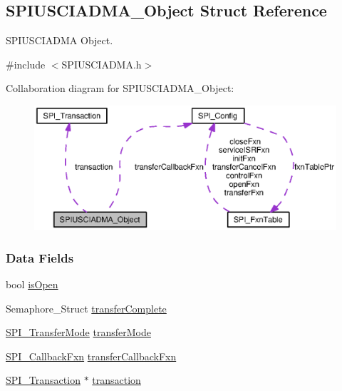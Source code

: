 \subsection{S\-P\-I\-U\-S\-C\-I\-A\-D\-M\-A\-\_\-\-Object Struct Reference}
\label{struct_s_p_i_u_s_c_i_a_d_m_a___object}


S\-P\-I\-U\-S\-C\-I\-A\-D\-M\-A Object.  




{\ttfamily \#include $<$S\-P\-I\-U\-S\-C\-I\-A\-D\-M\-A.\-h$>$}



Collaboration diagram for S\-P\-I\-U\-S\-C\-I\-A\-D\-M\-A\-\_\-\-Object\-:
\nopagebreak
\begin{figure}[H]
\begin{center}
\leavevmode
\includegraphics[width=350pt]{struct_s_p_i_u_s_c_i_a_d_m_a___object__coll__graph}
\end{center}
\end{figure}
\subsubsection*{Data Fields}
\begin{DoxyCompactItemize}
\item 
bool \hyperlink{struct_s_p_i_u_s_c_i_a_d_m_a___object_a3ffa3675d09e0d0346f89a0c88cbb9e1}{is\-Open}
\item 
Semaphore\-\_\-\-Struct \hyperlink{struct_s_p_i_u_s_c_i_a_d_m_a___object_af75e91d190a171a0824e8117f45b679e}{transfer\-Complete}
\item 
\hyperlink{_s_p_i_8h_ab9ea76c6529d6076eee5e1c4a5a92c6f}{S\-P\-I\-\_\-\-Transfer\-Mode} \hyperlink{struct_s_p_i_u_s_c_i_a_d_m_a___object_a3232e8ad2ad2cdb69726e4cbbfa03edc}{transfer\-Mode}
\item 
\hyperlink{_s_p_i_8h_aeb03e7608a14021c3b0acf92c90e2168}{S\-P\-I\-\_\-\-Callback\-Fxn} \hyperlink{struct_s_p_i_u_s_c_i_a_d_m_a___object_a796145d03c0defb17215b30b51ab9605}{transfer\-Callback\-Fxn}
\item 
\hyperlink{struct_s_p_i___transaction}{S\-P\-I\-\_\-\-Transaction} $\ast$ \hyperlink{struct_s_p_i_u_s_c_i_a_d_m_a___object_ad4a7ffe0d4c63fa15828258e5b7204d0}{transaction}
\end{DoxyCompactItemize}


